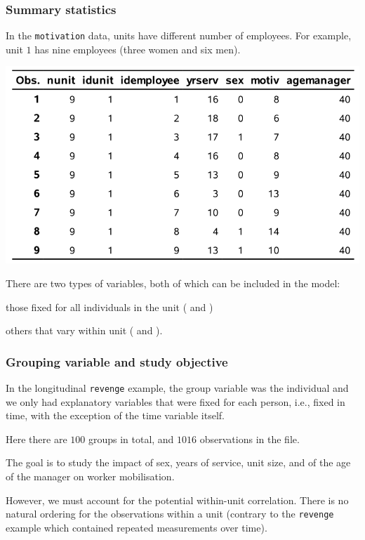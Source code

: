 \documentclass{beamer}
\begin{document}
\begin{frame}[fragile]
\frametitle{Summary statistics}
In the \texttt{motivation} data, units have different number of employees.
For example, unit $1$ has nine employees (three women and six men). 
\begin{center}
 \includegraphics[width = 0.7\linewidth]{img/c6/slides7-e06}
\end{center}
{\small 
There are two types of variables, both of which can be included in the model: 
\be

\item those fixed for all individuals in the unit ( and ) 
\item others that vary within unit ( and ). 
\ee
}
\end{frame}

\begin{frame}[fragile]
\frametitle{Grouping variable and study objective}
\bi
\item In the longitudinal \texttt{revenge} example, the group variable was the individual and we only had explanatory variables that were fixed for each person, i.e., fixed in time, with the exception of the time variable itself.
\item Here there are $100$ groups in total, and $1016$ observations in the file. 
\item The goal is to study the impact of sex, years of service, unit size, and of the age of the manager on worker mobilisation. 
\item However, we must account for the potential within-unit correlation. There is no natural ordering for the observations within a unit (contrary to the \texttt{revenge} example which contained repeated measurements over time).
\ei
\end{frame}
\end{document}
